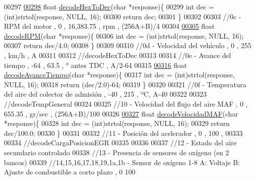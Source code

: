 \begin{DoxyCode}
{{00297 
\hyperlink{decoders_8hpp_aa7c5243702d5462e4b638450e750624e}{00298} \textcolor{keywordtype}{float} \hyperlink{decoders_8cpp_aa7c5243702d5462e4b638450e750624e}{decodeHexToDec}(\textcolor{keywordtype}{char} *response)\{
00299     \textcolor{keywordtype}{int} dec = (int)strtol(response, NULL, 16);
00300     \textcolor{keywordflow}{return} dec;
00301 \}
00302 
00303 \textcolor{comment}{//0c - RPM del motor , 0 , 16,383.75 , rpm , (256A+B)/4 }
00304 
\hyperlink{decoders_8hpp_a889868c7b1e554aee496e6aed7101cc4}{00305} \textcolor{keywordtype}{float} \hyperlink{decoders_8cpp_a889868c7b1e554aee496e6aed7101cc4}{decodeRPM}(\textcolor{keywordtype}{char} *response)\{
00306     \textcolor{keywordtype}{int} dec = (int)strtol(response, NULL, 16);
00307     \textcolor{keywordflow}{return} dec/4.0;
00308 \}
00309 
00310 \textcolor{comment}{//0d - Velocidad del vehículo , 0 , 255 , km/h , A}
00311 
00312 \textcolor{comment}{//decodeHexToDec}
00313 
00314 \textcolor{comment}{//0e - Avance del tiempo , -64 , 63.5 , ° antes TDC , A/2-64 }
00315 
\hyperlink{decoders_8hpp_a7a2fee87eace8ad6c86c628f5f91b3b5}{00316} \textcolor{keywordtype}{float} \hyperlink{decoders_8cpp_a7a2fee87eace8ad6c86c628f5f91b3b5}{decodeAvanceTiempo}(\textcolor{keywordtype}{char} *response)\{
00317     \textcolor{keywordtype}{int} dec = (int)strtol(response, NULL, 16);
00318     \textcolor{keywordflow}{return} (dec/2.0)-64;
00319 \}
00320 
00321 \textcolor{comment}{//0f - Temperatura del aire del colector de admisión , -40 , 215 , ºC, A-40}
00322 
00323 \textcolor{comment}{//decodeTempGeneral}
00324 
00325 \textcolor{comment}{//10 - Velocidad del flujo del aire MAF , 0 , 655.35  , gr/sec , (256A+B)/100 }
00326 
\hyperlink{decoders_8hpp_adceefeb78a70b295b378f4c472630aa1}{00327} \textcolor{keywordtype}{float} \hyperlink{decoders_8cpp_adceefeb78a70b295b378f4c472630aa1}{decodeVelocidadMAF}(\textcolor{keywordtype}{char} *response)\{
00328     \textcolor{keywordtype}{int} dec = (int)strtol(response, NULL, 16);
00329     \textcolor{keywordflow}{return} dec/100.0;
00330 \}
00331 
00332 \textcolor{comment}{//11 - Posición del acelerador , 0 , 100 , %
00333 
00334 \textcolor{comment}{//decodeCargaPosicionEGR}
00335 
00336 
00337 \textcolor{comment}{//12 - Estado del aire secundario controlado }
00338 \textcolor{comment}{//13 - Presencia de sensores de oxígeno (en 2 bancos) }
00339 \textcolor{comment}{//14,15,16,17,18,19,1a,1b - Sensor de oxígeno 1-8 A: Voltaje B: Ajuste de combustible a corto plazo , 0 100
}}}}
\end{DoxyCode}
